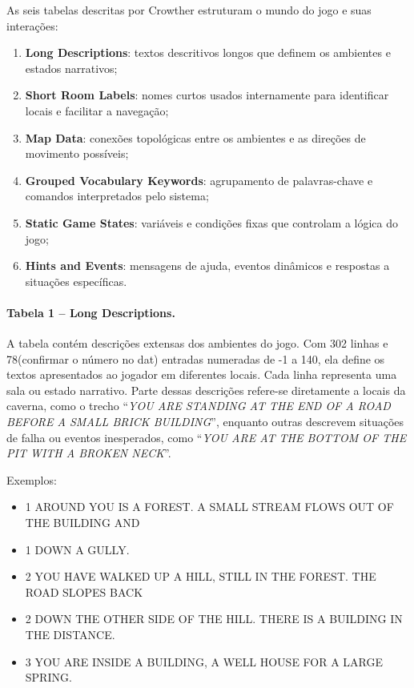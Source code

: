 \documentclass[12pt,a4paper]{article}
\begin{document}
As seis tabelas descritas por Crowther estruturam o mundo do jogo e suas interações:
\begin{enumerate}
    \item \textbf{Long Descriptions}: textos descritivos longos que definem os ambientes e estados narrativos;
    \item \textbf{Short Room Labels}: nomes curtos usados internamente para identificar locais e facilitar a navegação;
    \item \textbf{Map Data}: conexões topológicas entre os ambientes e as direções de movimento possíveis;
    \item \textbf{Grouped Vocabulary Keywords}: agrupamento de palavras-chave e comandos interpretados pelo sistema;
    \item \textbf{Static Game States}: variáveis e condições fixas que controlam a lógica do jogo;
    \item \textbf{Hints and Events}: mensagens de ajuda, eventos dinâmicos e respostas a situações específicas.
\end{enumerate}

\paragraph{Tabela 1 – Long Descriptions.}  
A tabela contém descrições extensas dos ambientes do jogo. Com 302 linhas e 78(confirmar o número no dat) entradas numeradas de -1 a 140, ela define os textos apresentados ao jogador em diferentes locais. Cada linha representa uma sala ou estado narrativo. Parte dessas descrições refere-se diretamente a locais da caverna, como o trecho “\textit{YOU ARE STANDING AT THE END OF A ROAD BEFORE A SMALL BRICK BUILDING}”, enquanto outras descrevem situações de falha ou eventos inesperados, como “\textit{YOU ARE AT THE BOTTOM OF THE PIT WITH A BROKEN NECK}”.  

Exemplos:  
\begin{itemize}
    \item 1	AROUND YOU IS A FOREST.  A SMALL STREAM FLOWS OUT OF THE BUILDING AND
    \item 1	DOWN A GULLY.
    \item 2	YOU HAVE WALKED UP A HILL, STILL IN THE FOREST.  THE ROAD SLOPES BACK
    \item 2	DOWN THE OTHER SIDE OF THE HILL.  THERE IS A BUILDING IN THE DISTANCE.
    \item 3	YOU ARE INSIDE A BUILDING, A WELL HOUSE FOR A LARGE SPRING.
\end{itemize}
\end{document}
